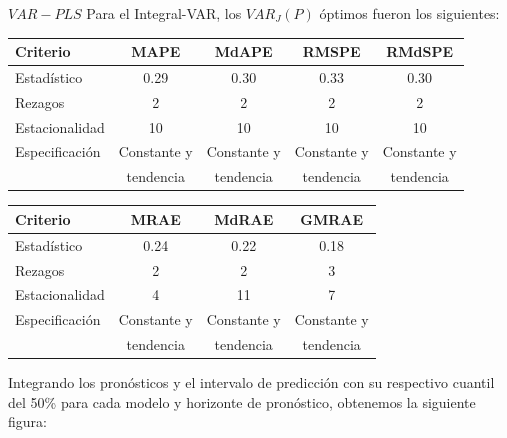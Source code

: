 \documentclass{beamer}
\newcommand{\?}{?`}
\begin{document}
\begin{frame}{$VAR-PLS$}
  Para el Integral-VAR, los $VAR_J(P)$ \'optimos fueron los
  siguientes:
  \medskip

  \begin{footnotesize}
  \begin{tabular}{|l|c|c|c|c|}
    \hline
    Criterio & MAPE & MdAPE & RMSPE & RMdSPE \\
    \hline
    Estad\'istico & 0.29 & 0.30 & 0.33 & 0.30 \\
    Rezagos & 2 & 2& 2& 2 \\
    Estacionalidad & 10 & 10 & 10 & 10 \\
    Especificaci\'on & Constante y & Constante y & Constante y &
    Constante y \\
    & tendencia & tendencia & tendencia& tendencia \\
    \hline
  \end{tabular}
  \end{footnotesize}

  \begin{footnotesize}
  \begin{tabular}{|l|c|c|c|}
    \hline
    Criterio & MRAE & MdRAE & GMRAE \\
    \hline
    Estad\'istico & 0.24 & 0.22 & 0.18 \\
    Rezagos & 2& 2 & 3 \\
    Estacionalidad & 4 & 11 & 7 \\
    Especificaci\'on & Constante y & Constante y & Constante y \\
    & tendencia& tendencia& tendencia \\
    \hline
  \end{tabular}
  \end{footnotesize}
  \medskip

  Integrando los pron\'osticos y el intervalo de predicci\'on con su
  respectivo cuantil del 50\% para cada modelo y horizonte de
  pron\'ostico, obtenemos la siguiente figura:
\end{frame}
\end{document}
